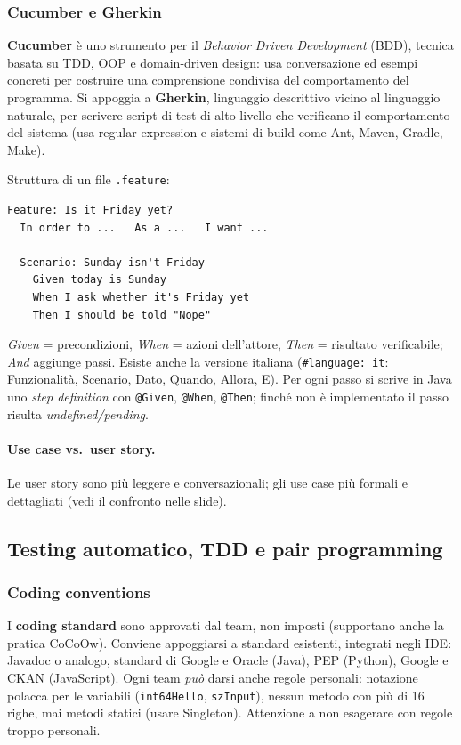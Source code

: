 \documentclass[a4paper,12pt]{article}
\begin{document}
\subsubsection{Cucumber e Gherkin}
\textbf{Cucumber} è uno strumento per il \emph{Behavior Driven Development} (BDD),
tecnica basata su TDD, OOP e domain-driven design: usa conversazione ed esempi concreti
per costruire una comprensione condivisa del comportamento del programma. Si appoggia a
\textbf{Gherkin}, linguaggio descrittivo vicino al linguaggio naturale, per scrivere
script di test di alto livello che verificano il comportamento del sistema (usa regular
expression e sistemi di build come Ant, Maven, Gradle, Make).

Struttura di un file \texttt{.feature}:
\begin{verbatim}
Feature: Is it Friday yet?
  In order to ...   As a ...   I want ...

  Scenario: Sunday isn't Friday
    Given today is Sunday
    When I ask whether it's Friday yet
    Then I should be told "Nope"
\end{verbatim}
\emph{Given} = precondizioni, \emph{When} = azioni dell'attore, \emph{Then} = risultato
verificabile; \emph{And} aggiunge passi. Esiste anche la versione italiana
(\texttt{\#language: it}: Funzionalità, Scenario, Dato, Quando, Allora, E). Per ogni passo
si scrive in Java uno \emph{step definition} con \verb|@Given|, \verb|@When|, \verb|@Then|;
finché non è implementato il passo risulta \emph{undefined/pending}.

\paragraph{Use case vs.\ user story.} Le user story sono più leggere e conversazionali;
gli use case più formali e dettagliati (vedi il confronto nelle slide).

\newpage
\subsection{Testing automatico, TDD e pair programming}

\subsubsection{Coding conventions}
I \textbf{coding standard} sono approvati dal team, non imposti (supportano anche la
pratica CoCoOw). Conviene appoggiarsi a standard esistenti, integrati negli IDE: Javadoc o
analogo, standard di Google e Oracle (Java), PEP (Python), Google e CKAN (JavaScript).
Ogni team \emph{può} darsi anche regole personali: notazione polacca per le variabili
(\texttt{int64Hello}, \texttt{szInput}), nessun metodo con più di 16 righe, mai metodi
statici (usare Singleton). Attenzione a non esagerare con regole troppo personali.
\end{document}

